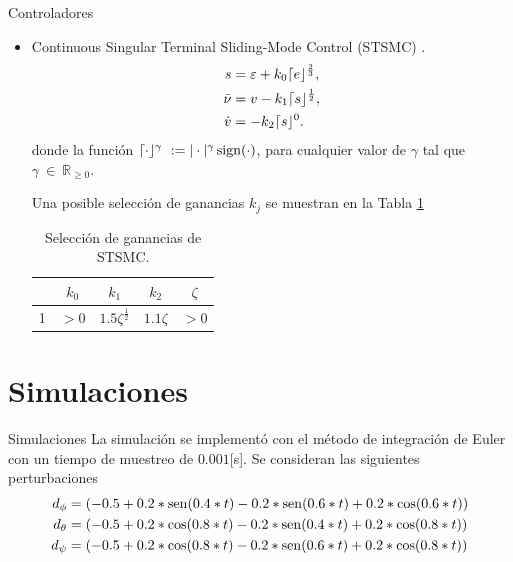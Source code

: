 \documentclass[hyperref={pdfpagelabels=false}]{beamer}
\begin{document}
\begin{frame}{Controladores}
\begin{itemize}
\item Continuous Singular Terminal Sliding-Mode Control (STSMC) .
\begin{equation}
    \begin{split}
        s &= \varepsilon + k_{0} \lceil e \rfloor ^{\frac{2}{3}},\\
        \Bar{\nu} &= v - k_{1} \lceil s \rfloor ^{\frac{1}{2}} ,\\
        \dot{v} & = -k_{2} \lceil s \rfloor ^0.
    \end{split}\label{STSMC}
\end{equation}
donde la funci\'on $\lceil \cdot  \rfloor^{\gamma}~ := |\cdot|^{\gamma} \operatorname{sign}(\cdot)$, para cualquier valor de $\gamma$ tal que $\gamma ~ \in ~ \mathbb{R}_{\geq 0}$. 

Una posible selección de ganancias $k_{j}$ se muestran en la Tabla \ref{tab:tab3}

\begin{table}[H]
\begin{center}
\begin{tabular}{ c  c  c  c  c  }
\hline
 & $k_{0}$ & $k_{1}$                & $k_{2}$  & $\zeta$ \\ \hline
1 & $>0$      & $1.5\zeta^{\frac{1}{2}}$ & $1.1\zeta$ & $>0$  \\ \hline
\end{tabular}
\caption{Selección de ganancias de STSMC.}
\label{tab:tab3}
\end{center}
\end{table}

\end{itemize}

\end{frame}


\section{Simulaciones}

\begin{frame}{Simulaciones}
La simulación se implementó con el método de integración de Euler con un tiempo de muestreo de $0.001$[s]. Se consideran las siguientes perturbaciones 
\begin{equation}
\begin{split}
d_\phi&=(-0.5+0.2*\operatorname{sen}(0.4*t)-0.2*\operatorname{sen}(0.6*t)+0.2*\cos(0.6*t))\\
d_\theta&=(-0.5+0.2*\cos(0.8*t)-0.2*\operatorname{sen}(0.4*t)+0.2*\cos(0.8*t))\\
d_\psi&=(-0.5+0.2*\cos(0.8*t)-0.2*\operatorname{sen}(0.6*t)+0.2*\cos(0.8*t))
\end{split}    
\end{equation}

\end{frame}
\end{document}
